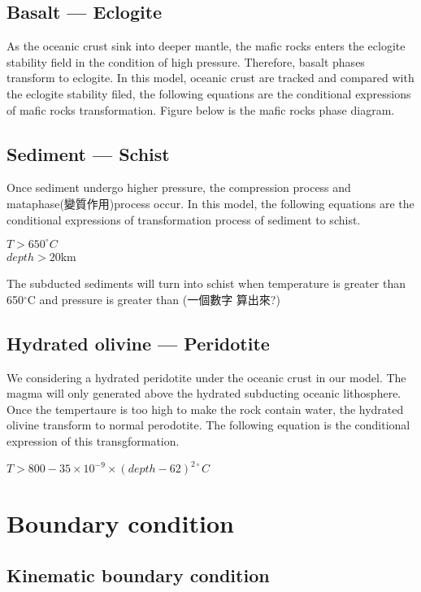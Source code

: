 \subsection{Basalt --- Eclogite}

As the oceanic crust sink into deeper mantle, the mafic rocks enters the eclogite stability field in the condition of high pressure. 
Therefore, basalt phases transform to eclogite.  
In this model, oceanic crust are tracked and compared with the eclogite stability filed, the following equations are the conditional expressions of mafic rocks transformation. 
Figure below is the mafic rocks phase diagram.

\subsection{Sediment --- Schist}

Once sediment undergo higher pressure, the compression process and mataphase(變質作用)process occur.
In this model, the following equations are the conditional expressions of transformation process of sediment to schist.

$T > 650^{\circ} C$\\
$depth >  20 $km 

The subducted sediments will turn into schist when temperature is greater than 650$^\circ$C and pressure is greater than (一個數字 算出來?)

\subsection{Hydrated olivine --- Peridotite}

We considering a hydrated peridotite under the oceanic crust in our model. 
The magma will only generated above the hydrated subducting oceanic lithosphere.
Once the tempertaure is too high to make the rock contain water, the hydrated olivine transform to normal perodotite.
The following equation is the conditional expression of this transgformation.

$T > 800-35\times 10^{-9}\times (depth-62)^{2\circ}C$

\section{Boundary condition}

\subsection{Kinematic boundary condition}

